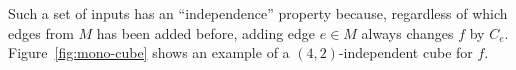 
Such a set of inputs has an ``independence'' property because,
regardless of which edges from $M$ has been added before, adding edge $e \in M$
always changes $f$ by $C_e$. 
Figure~\ref{fig:mono-cube} shows an example of a $(4,2)$-independent cube for $f$. 

